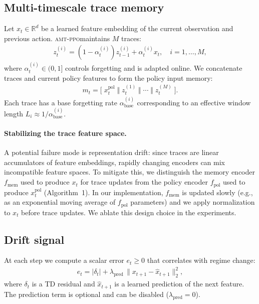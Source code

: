 \documentclass{article}
\newcommand{\AMT}{\textsc{amt-ppo}}
\begin{document}
\subsection{Multi-timescale trace memory}
Let $x_t \in \mathbb{R}^d$ be a learned feature embedding of the current observation and previous action. \AMT maintains $M$ traces:
\begin{align}
z_t^{(i)} = (1-\alpha_t^{(i)}) z_{t-1}^{(i)} + \alpha_t^{(i)} x_t,\quad i=1,\dots,M,
\end{align}
where $\alpha_t^{(i)} \in (0,1]$ controls forgetting and is adapted online. We concatenate traces and current policy features to form the policy input memory:
\begin{align}
m_t = \big[\; x_t^{\text{pol}} \;\Vert\; z_t^{(1)} \;\Vert\; \cdots \;\Vert\; z_t^{(M)} \;\big].
\end{align}
Each trace has a base forgetting rate $\alpha_{\text{base}}^{(i)}$ corresponding to an effective window length $L_i \approx 1/\alpha_{\text{base}}^{(i)}$.

\paragraph{Stabilizing the trace feature space.}
A potential failure mode is representation drift: since traces are linear accumulators of feature embeddings, rapidly changing encoders can mix incompatible feature spaces. To mitigate this, we distinguish the memory encoder $f_{\text{mem}}$ used to produce $x_t$ for trace updates from the policy encoder $f_{\text{pol}}$ used to produce $x_t^{\text{pol}}$ (Algorithm~1). In our implementation, $f_{\text{mem}}$ is updated slowly (e.g., as an exponential moving average of $f_{\text{pol}}$ parameters) and we apply normalization to $x_t$ before trace updates. We ablate this design choice in the experiments.


\subsection{Drift signal}
At each step we compute a scalar error $e_t \ge 0$ that correlates with regime change:
\begin{align}
e_t = \lvert \delta_t \rvert + \lambda_{\text{pred}} \, \lVert x_{t+1} - \hat{x}_{t+1} \rVert_2^2,
\end{align}
where $\delta_t$ is a TD residual and $\hat{x}_{t+1}$ is a learned prediction of the next feature. The prediction term is optional and can be disabled ($\lambda_{\text{pred}}=0$).
\end{document}
